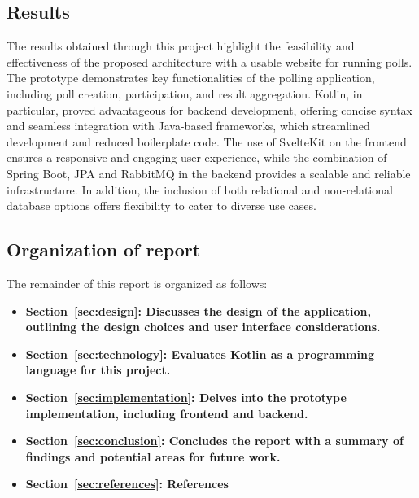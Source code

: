 \subsection{Results}
The results obtained through this project highlight the feasibility and effectiveness of the proposed architecture with a usable website for running polls.
The prototype demonstrates key functionalities of the polling application, including poll creation, participation, and result aggregation.
Kotlin, in particular, proved advantageous for backend development, offering concise syntax and seamless integration with Java-based frameworks, which streamlined development and reduced boilerplate code.
The use of SvelteKit on the frontend ensures a responsive and engaging user experience, while the combination of Spring Boot, JPA and RabbitMQ in the backend provides a scalable and reliable infrastructure.
In addition, the inclusion of both relational and non-relational database options offers flexibility to cater to diverse use cases. \\

\subsection{Organization of report}
The remainder of this report is organized as follows:
\begin{itemize}
    \item \textbf{Section~\ref{sec:design}: Discusses the design of the application, outlining the design choices and user interface considerations.}
    \item \textbf{Section~\ref{sec:technology}: Evaluates Kotlin as a programming language for this project.}
    \item \textbf{Section~\ref{sec:implementation}: Delves into the prototype implementation, including frontend and backend.}
    \item \textbf{Section~\ref{sec:conclusion}: Concludes the report with a summary of findings and potential areas for future work.}
    \item \textbf{Section~\ref{sec:references}: References}
\end{itemize}
